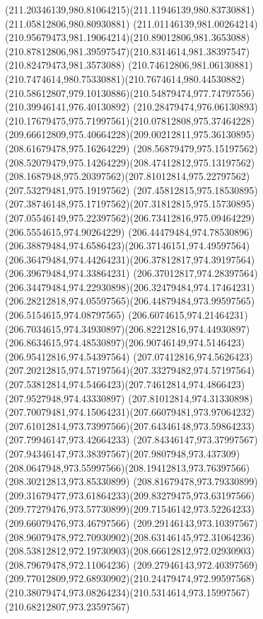 {{	\curveto(211.20346139,980.81064215)(211.11946139,980.83730881)(211.05812806,980.80930881)
	\curveto(211.01146139,981.00264214)(210.95679473,981.19064214)(210.89012806,981.3653088)
	\curveto(210.87812806,981.39597547)(210.8314614,981.38397547)(210.82479473,981.3573088)
	\curveto(210.74612806,981.06130881)(210.7474614,980.75330881)(210.7674614,980.44530882)
	\curveto(210.58612807,979.10130886)(210.54879474,977.74797556)(210.39946141,976.40130892)
	\curveto(210.28479474,976.06130893)(210.17679475,975.71997561)(210.07812808,975.37464228)
	\curveto(209.66612809,975.40664228)(209.00212811,975.36130895)(208.61679478,975.16264229)
	\curveto(208.56879479,975.15197562)(208.52079479,975.14264229)(208.47412812,975.13197562)
	\curveto(208.1687948,975.20397562)(207.81012814,975.22797562)(207.53279481,975.19197562)
	\curveto(207.45812815,975.18530895)(207.38746148,975.17197562)(207.31812815,975.15730895)
	\curveto(207.05546149,975.22397562)(206.73412816,975.09464229)(206.5554615,974.90264229)
	\curveto(206.44479484,974.78530896)(206.38879484,974.6586423)(206.37146151,974.49597564)
	\curveto(206.36479484,974.44264231)(206.37812817,974.39197564)(206.39679484,974.33864231)
	\curveto(206.37012817,974.28397564)(206.34479484,974.22930898)(206.32479484,974.17464231)
	\curveto(206.28212818,974.05597565)(206.44879484,973.99597565)(206.5154615,974.08797565)
	\curveto(206.6074615,974.21464231)(206.7034615,974.34930897)(206.82212816,974.44930897)
	\curveto(206.8634615,974.48530897)(206.90746149,974.5146423)(206.95412816,974.54397564)
	\curveto(207.07412816,974.5626423)(207.20212815,974.57197564)(207.33279482,974.57197564)
	\curveto(207.53812814,974.5466423)(207.74612814,974.4866423)(207.9527948,974.43330897)
	\curveto(207.81012814,974.31330898)(207.70079481,974.15064231)(207.66079481,973.97064232)
	\curveto(207.61012814,973.73997566)(207.64346148,973.59864233)(207.79946147,973.42664233)
	\curveto(207.84346147,973.37997567)(207.94346147,973.38397567)(207.9807948,973.437309)
	\curveto(208.0647948,973.55997566)(208.19412813,973.76397566)(208.30212813,973.85330899)
	\curveto(208.81679478,973.79330899)(209.31679477,973.61864233)(209.83279475,973.63197566)
	\curveto(209.77279476,973.57730899)(209.71546142,973.52264233)(209.66079476,973.46797566)
	\curveto(209.29146143,973.10397567)(208.96079478,972.70930902)(208.63146145,972.31064236)
	\curveto(208.53812812,972.19730903)(208.66612812,972.02930903)(208.79679478,972.11064236)
	\curveto(209.27946143,972.40397569)(209.77012809,972.68930902)(210.24479474,972.99597568)
	\curveto(210.38079474,973.08264234)(210.5314614,973.15997567)(210.68212807,973.23597567)
}}
